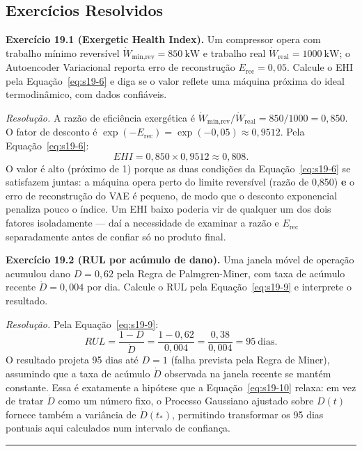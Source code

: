 \documentclass[12pt,a4paper]{article}
\numberwithin{equation}{section}
\numberwithin{table}{section}
\numberwithin{figure}{section}
\begin{document}
\subsection{Exercícios Resolvidos}

\textbf{Exercício 19.1 (Exergetic Health Index).} Um compressor opera com
trabalho mínimo reversível $\dot{W}_{\text{min,rev}} = 850\ \mathrm{kW}$ e
trabalho real $\dot{W}_{\text{real}} = 1000\ \mathrm{kW}$; o Autoencoder
Variacional reporta erro de reconstrução $E_{\text{rec}} = 0{,}05$. Calcule
o EHI pela Equação~\eqref{eq:s19-6} e diga se o valor reflete uma máquina
próxima do ideal termodinâmico, com dados confiáveis.

\emph{Resolução.} A razão de eficiência exergética é
$\dot{W}_{\text{min,rev}}/\dot{W}_{\text{real}} = 850/1000 = 0{,}850$. O
fator de desconto é $\exp(-E_{\text{rec}}) = \exp(-0{,}05) \approx 0{,}9512$.
Pela Equação~\eqref{eq:s19-6}:
$$EHI = 0{,}850 \times 0{,}9512 \approx 0{,}808.$$
O valor é alto (próximo de 1) porque as duas condições da
Equação~\eqref{eq:s19-6} se satisfazem juntas: a máquina opera perto do
limite reversível (razão de 0,850) \textbf{e} o erro de reconstrução do VAE
é pequeno, de modo que o desconto exponencial penaliza pouco o índice. Um
EHI baixo poderia vir de qualquer um dos dois fatores isoladamente --- daí
a necessidade de examinar a razão e $E_{\text{rec}}$ separadamente antes de
confiar só no produto final.

\textbf{Exercício 19.2 (RUL por acúmulo de dano).} Uma janela móvel de
operação acumulou dano $D = 0{,}62$ pela Regra de Palmgren-Miner, com taxa
de acúmulo recente $\dot{D} = 0{,}004$ por dia. Calcule o RUL pela
Equação~\eqref{eq:s19-9} e interprete o resultado.

\emph{Resolução.} Pela Equação~\eqref{eq:s19-9}:
$$RUL = \frac{1 - D}{\dot{D}} = \frac{1 - 0{,}62}{0{,}004} =
\frac{0{,}38}{0{,}004} = 95\ \text{dias}.$$
O resultado projeta 95 dias até $D = 1$ (falha prevista pela Regra de
Miner), assumindo que a taxa de acúmulo $\dot{D}$ observada na janela
recente se mantém constante. Essa é exatamente a hipótese que a
Equação~\eqref{eq:s19-10} relaxa: em vez de tratar $\dot{D}$ como um número
fixo, o Processo Gaussiano ajustado sobre $D(t)$ fornece também a variância
de $\dot{D}(t_*)$, permitindo transformar os 95 dias pontuais aqui
calculados num intervalo de confiança.

\vspace{1em}
\hrule
\vspace{1em}
\end{document}
